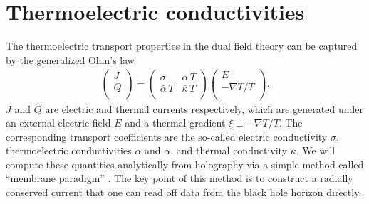 \documentclass[preprint,onecolumn,nofootinbib]{revtex4}
\begin{document}
\section{Thermoelectric conductivities} \label{CC}

The thermoelectric transport properties in the dual field theory can be captured by the generalized Ohm's law
\begin{eqnarray}\label{ohm}
	\left(  \begin{array}{c}
		J \\
		Q \\
	\end{array}\right)=\left(
	\begin{array}{cc}
		\sigma & \alpha \,T \\
		\bar{\alpha}\, T & \bar{\kappa} \,T \\
	\end{array}
	\right)
	\left(  \begin{array}{c}
		E \\
		-\nabla T/T \\
	\end{array}\right).
\end{eqnarray}
$J$ and $Q$ are electric and thermal currents respectively, which are generated under an external electric field $E$ and a thermal gradient $\xi\equiv-\nabla T/T$. The corresponding transport coefficients are the so-called electric conductivity $\sigma$,  thermoelectric conductivities $\alpha$ and $\bar{\alpha}$, and thermal conductivity $\bar{\kappa}$. We will compute these quantities analytically from holography via a simple method called ``membrane paradigm'' \cite{Iqbal:2008by,Blake:2013bqa,Donos:2014uba,Donos:2014cya,Baggioli:2016pia,Baggioli:2017ojd}. The key point of this method is to construct a radially conserved current that one can read off data from the black hole horizon directly.
\end{document}

